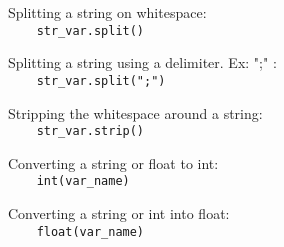 Splitting a string on whitespace:\\
{\ex \lstinline|    str_var.split()|}

Splitting a string using a delimiter. Ex: ";" :\\
{\ex \lstinline|    str_var.split(";")|}

Stripping the whitespace around a string:\\
{\ex \lstinline|    str_var.strip()|}

Converting a string or float to int:\\
{\ex \lstinline|    int(var_name)|}

Converting a string or int into float:\\
{\ex \lstinline|    float(var_name)|}

